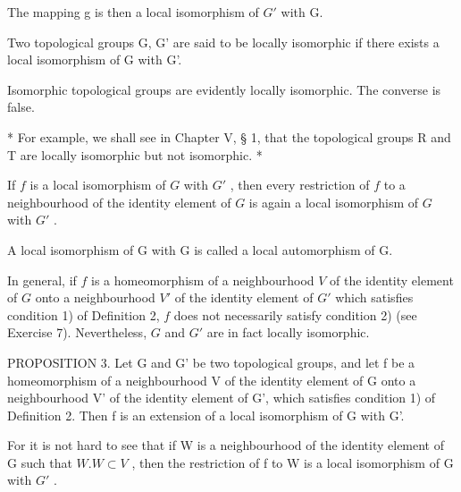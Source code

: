 The mapping g is then a local isomorphism of \(G'\) with G.

Two topological groups G, G' are said to be locally isomorphic if there exists a local isomorphism of G with G'.

Isomorphic topological groups are evidently locally isomorphic. The converse is false.

* For example, we shall see in Chapter V, § 1, that the topological groups R and T are locally isomorphic but not isomorphic. *

If \(f\) is a local isomorphism of \(G\) with \(G'\) , then every restriction of \(f\) to a neighbourhood of the identity element of \(G\) is again a local isomorphism of \(G\) with \(G'\) .

A local isomorphism of G with G is called a local automorphism of G.

In general, if \(f\) is a homeomorphism of a neighbourhood \(V\) of the identity element of \(G\) onto a neighbourhood \(V'\) of the identity element of \(G'\) which satisfies condition 1) of Definition 2, \(f\) does not necessarily satisfy condition 2) (see Exercise 7). Nevertheless, \(G\) and \(G'\) are in fact locally isomorphic.

PROPOSITION 3. Let G and G' be two topological groups, and let f be a homeomorphism of a neighbourhood V of the identity element of G onto a neighbourhood V' of the identity element of G', which satisfies condition 1) of Definition 2. Then f is an extension of a local isomorphism of G with G'.

For it is not hard to see that if W is a neighbourhood of the identity element of G such that \(W.W \subset V\) , then the restriction of f to W is a local isomorphism of G with \(G'\) .

